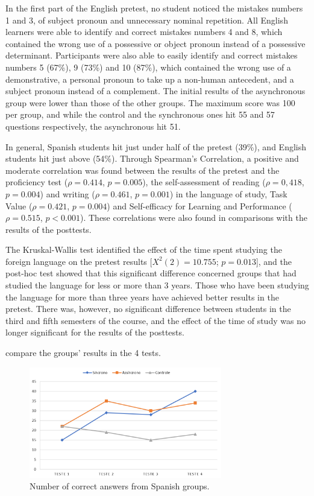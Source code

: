 \documentclass{textolivre}
\begin{document}
In the first part of the English pretest, no student noticed the
mistakes numbers 1 and 3, of subject pronoun and unnecessary nominal
repetition. All English learners were able to identify and correct
mistakes numbers 4 and 8, which contained the wrong use of a possessive
or object pronoun instead of a possessive determinant. Participants were
also able to easily identify and correct mistakes numbers 5 (67\%), 9
(73\%) and 10 (87\%), which contained the wrong use of a demonstrative,
a personal pronoun to take up a non-human antecedent, and a subject
pronoun instead of a complement. The initial results of the asynchronous
group were lower than those of the other groups. The maximum score was
100 per group, and while the control and the synchronous ones hit 55 and
57 questions respectively, the asynchronous hit 51.

In general, Spanish students hit just under half of the pretest (39\%),
and English students hit just above (54\%). Through Spearman's
Correlation, a positive and moderate correlation was found between the
results of the pretest and the proficiency test ($ρ = 0.414$, $p = 0.005$),
the self-assessment of reading ($ρ = 0,418$, $p = 0.004$) and writing 
($ρ = 0.461$, $p = 0.001$) in the language of study, Task Value ($ρ = 0.421$, $p = 0.004$)
and Self-efficacy for Learning and Performance ($ρ = 0.515$, $p < 0.001$). 
These correlations were also found in comparisons
with the results of the posttests.

The Kruskal-Wallis test \cite{kruskal_use_1952} identified the effect
of the time spent studying the foreign language on the pretest results
[$X^2(2) = 10.755$; $p = 0.013$], and the post-hoc test showed that this
significant difference concerned groups that had studied the language
for less or more than 3 years. Those who have been studying the language
for more than three years have achieved better results in the pretest.
There was, however, no significant difference between students in the
third and fifth semesters of the course, and the effect of the time of
study was no longer significant for the results of the posttests.

 compare the groups’ results in the 4 tests.

%
%
\begin{figure}[htbp]
 \centering
 \includegraphics[width=0.75\textwidth]{fig03.png}
 \caption{Number of correct answers from Spanish groups.}
 \label{fig03}
\end{figure}
\end{document}
